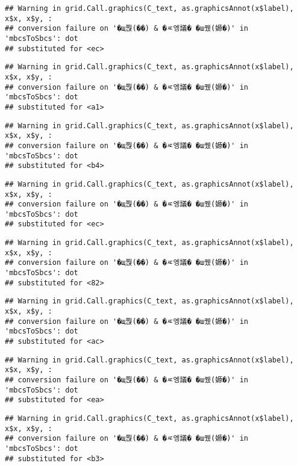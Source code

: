 \documentclass[
]{article}
\begin{document}
\begin{verbatim}
## Warning in grid.Call.graphics(C_text, as.graphicsAnnot(x$label), x$x, x$y, :
## conversion failure on '�щ쭩(��) & �ㅼ엥議� �ш퀬(嫄�)' in 'mbcsToSbcs': dot
## substituted for <ec>
\end{verbatim}

\begin{verbatim}
## Warning in grid.Call.graphics(C_text, as.graphicsAnnot(x$label), x$x, x$y, :
## conversion failure on '�щ쭩(��) & �ㅼ엥議� �ш퀬(嫄�)' in 'mbcsToSbcs': dot
## substituted for <a1>
\end{verbatim}

\begin{verbatim}
## Warning in grid.Call.graphics(C_text, as.graphicsAnnot(x$label), x$x, x$y, :
## conversion failure on '�щ쭩(��) & �ㅼ엥議� �ш퀬(嫄�)' in 'mbcsToSbcs': dot
## substituted for <b4>
\end{verbatim}

\begin{verbatim}
## Warning in grid.Call.graphics(C_text, as.graphicsAnnot(x$label), x$x, x$y, :
## conversion failure on '�щ쭩(��) & �ㅼ엥議� �ш퀬(嫄�)' in 'mbcsToSbcs': dot
## substituted for <ec>
\end{verbatim}

\begin{verbatim}
## Warning in grid.Call.graphics(C_text, as.graphicsAnnot(x$label), x$x, x$y, :
## conversion failure on '�щ쭩(��) & �ㅼ엥議� �ш퀬(嫄�)' in 'mbcsToSbcs': dot
## substituted for <82>
\end{verbatim}

\begin{verbatim}
## Warning in grid.Call.graphics(C_text, as.graphicsAnnot(x$label), x$x, x$y, :
## conversion failure on '�щ쭩(��) & �ㅼ엥議� �ш퀬(嫄�)' in 'mbcsToSbcs': dot
## substituted for <ac>
\end{verbatim}

\begin{verbatim}
## Warning in grid.Call.graphics(C_text, as.graphicsAnnot(x$label), x$x, x$y, :
## conversion failure on '�щ쭩(��) & �ㅼ엥議� �ш퀬(嫄�)' in 'mbcsToSbcs': dot
## substituted for <ea>
\end{verbatim}

\begin{verbatim}
## Warning in grid.Call.graphics(C_text, as.graphicsAnnot(x$label), x$x, x$y, :
## conversion failure on '�щ쭩(��) & �ㅼ엥議� �ш퀬(嫄�)' in 'mbcsToSbcs': dot
## substituted for <b3>
\end{verbatim}
\end{document}
